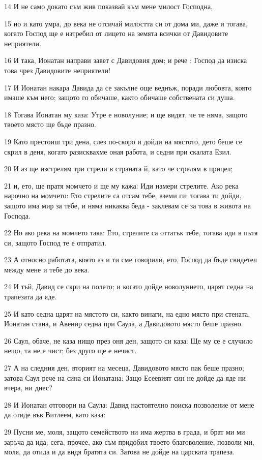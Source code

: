 \par 14 И не само докато съм жив показвай към мене милост Господна,
\par 15 но и като умра, до века не отсичай милостта си от дома ми, даже и тогава, когато Господ ще е изтребил от лицето на земята всички от Давидовите неприятели.
\par 16 И така, Ионатан направи завет с Давидовия дом; и рече : Господ да изиска това чрез Давидовите неприятели!
\par 17 И Ионатан накара Давида да се закълне още веднъж, поради любовта, която имаше към него; защото го обичаше, както обичаше собствената си душа.
\par 18 Тогава Ионатан му каза: Утре е новолуние; и ще видят, че те няма, защото твоето място ще бъде празно.
\par 19 Като престоиш три дена, слез по-скоро и дойди на мястото, дето беше се скрил в деня, когато разисквахме оная работа, и седни при скалата Езил.
\par 20 И аз ще изстрелям три стрели в страната й, като че стрелям в прицел;
\par 21 и, ето, ще пратя момчето и ще му кажа: Иди намери стрелите. Ако река нарочно на момчето: Ето стрелите са отсам тебе, вземи ги: тогава ти дойди, защото има мир за тебе, и няма никаква беда - заклевам се за това в живота на Господа.
\par 22 Но ако река на момчето така: Ето, стрелите са оттатък тебе, тогава иди в пътя си, защото Господ те е отпратил.
\par 23 А относно работата, която аз и ти сме говорили, ето, Господ да бъде свидетел между мене и тебе до века.
\par 24 И тъй, Давид се скри на полето; и когато дойде новолунието, царят седна на трапезата да яде.
\par 25 И като седна царят на мястото си, както винаги, на едно място при стената, Ионатан стана, и Авенир седна при Саула, а Давидовото място беше празно.
\par 26 Саул, обаче, не каза нищо през оня ден, защото си каза: Ще му се е случило нещо, та не е чист; без друго ще е нечист.
\par 27 А на следния ден, вторият на месеца, Давидовото място пак беше празно; затова Саул рече на сина си Ионатана: Защо Есеевият син не дойде да яде ни вчера, ни днес?
\par 28 И Ионатан отговори на Саула: Давид настоятелно поиска позволение от мене да отиде във Витлеем, като каза:
\par 29 Пусни ме, моля, защото семейството ни има жертва в града, и брат ми ми заръча да ида; сега, прочее, ако съм придобил твоето благоволение, позволи ми, моля, да отида и да видя братята си. Затова не дойде на царската трапеза.
